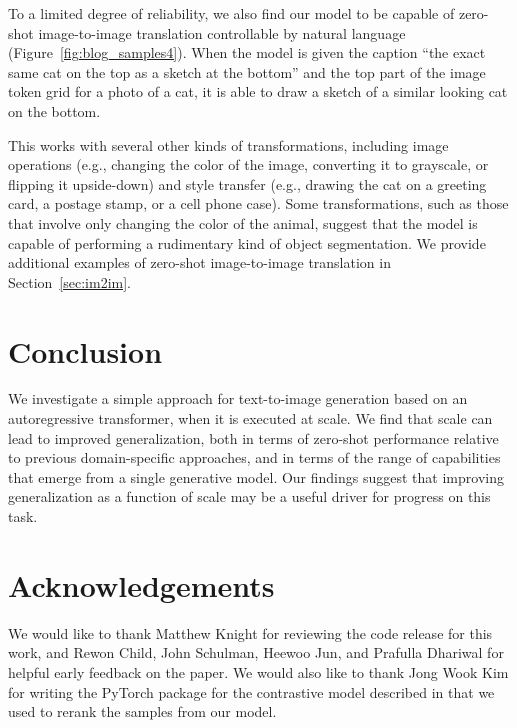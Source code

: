 \documentclass{article}
\begin{document}
To a limited degree of reliability, we also find our model to be capable of zero-shot image-to-image translation controllable by natural language (Figure~\ref{fig:blog_samples4}). When the model is given the caption ``the exact same cat on the top as a sketch at the bottom'' and the top  part of the image token grid for a photo of a cat, it is able to draw a sketch of a similar looking cat on the bottom. 

This works with several other kinds of transformations, including image operations (e.g., changing the color of the image, converting it to grayscale, or flipping it upside-down) and style transfer (e.g., drawing the cat on a greeting card, a postage stamp, or a cell phone case). Some transformations, such as those that involve only changing the color of the animal, suggest that the model is capable of performing a rudimentary kind of object segmentation. We provide additional examples of zero-shot image-to-image translation in Section~\ref{sec:im2im}.

\section{Conclusion}

We investigate a simple approach for text-to-image generation based on an autoregressive transformer, when it is executed at scale. We find that scale can lead to improved generalization, both in terms of zero-shot performance relative to previous domain-specific approaches, and in terms of the range of capabilities that emerge from a single generative model. Our findings suggest that improving generalization as a function of scale may be a useful driver for progress on this task.



\section*{Acknowledgements}

We would like to thank Matthew Knight for reviewing the code release for this work, and Rewon Child, John Schulman, Heewoo Jun, and Prafulla Dhariwal for helpful early feedback on the paper. We would also like to thank Jong Wook Kim for writing the PyTorch package for the contrastive model described in \citet{radford2019language} that we used to rerank the samples from our model.




\newpage\appendix\onecolumn
\end{document}
